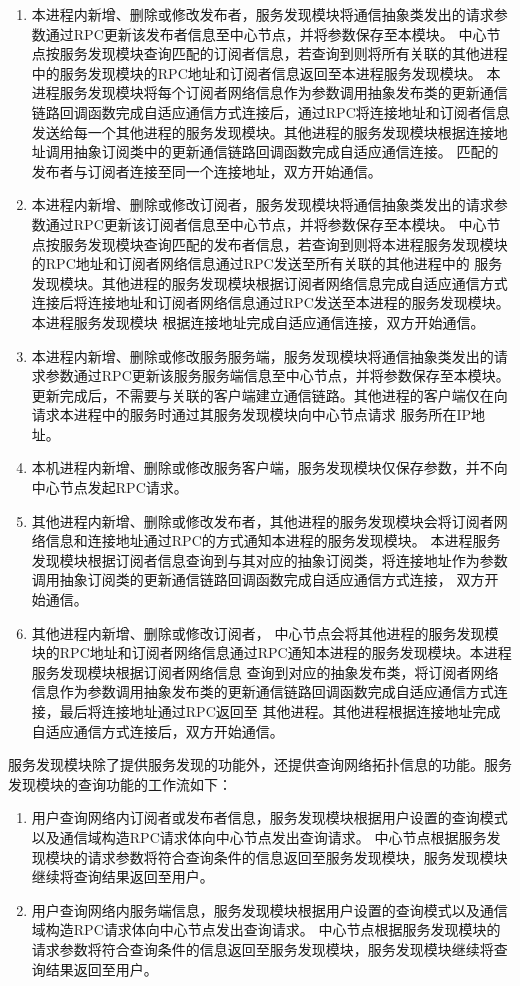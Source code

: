 \begin{enumerate}
  \item 本进程内新增、删除或修改发布者，服务发现模块将通信抽象类发出的请求参数通过RPC更新该发布者信息至中心节点，并将参数保存至本模块。
  中心节点按服务发现模块查询匹配的订阅者信息，若查询到则将所有关联的其他进程中的服务发现模块的RPC地址和订阅者信息返回至本进程服务发现模块。
  本进程服务发现模块将每个订阅者网络信息作为参数调用抽象发布类的更新通信链路回调函数完成自适应通信方式连接后，通过RPC将连接地址和订阅者信息
  发送给每一个其他进程的服务发现模块。其他进程的服务发现模块根据连接地址调用抽象订阅类中的更新通信链路回调函数完成自适应通信连接。
  匹配的发布者与订阅者连接至同一个连接地址，双方开始通信。
  \item 本进程内新增、删除或修改订阅者，服务发现模块将通信抽象类发出的请求参数通过RPC更新该订阅者信息至中心节点，并将参数保存至本模块。
  中心节点按服务发现模块查询匹配的发布者信息，若查询到则将本进程服务发现模块的RPC地址和订阅者网络信息通过RPC发送至所有关联的其他进程中的
  服务发现模块。其他进程的服务发现模块根据订阅者网络信息完成自适应通信方式连接后将连接地址和订阅者网络信息通过RPC发送至本进程的服务发现模块。本进程服务发现模块
  根据连接地址完成自适应通信连接，双方开始通信。
  \item 本进程内新增、删除或修改服务服务端，服务发现模块将通信抽象类发出的请求参数通过RPC更新该服务服务端信息至中心节点，并将参数保存至本模块。
  更新完成后，不需要与关联的客户端建立通信链路。其他进程的客户端仅在向请求本进程中的服务时通过其服务发现模块向中心节点请求
  服务所在IP地址。
  \item 本机进程内新增、删除或修改服务客户端，服务发现模块仅保存参数，并不向中心节点发起RPC请求。
  \item 其他进程内新增、删除或修改发布者，其他进程的服务发现模块会将订阅者网络信息和连接地址通过RPC的方式通知本进程的服务发现模块。
  本进程服务发现模块根据订阅者信息查询到与其对应的抽象订阅类，将连接地址作为参数调用抽象订阅类的更新通信链路回调函数完成自适应通信方式连接，
  双方开始通信。
  \item 其他进程内新增、删除或修改订阅者，
  中心节点会将其他进程的服务发现模块的RPC地址和订阅者网络信息通过RPC通知本进程的服务发现模块。本进程服务发现模块根据订阅者网络信息
  查询到对应的抽象发布类，将订阅者网络信息作为参数调用抽象发布类的更新通信链路回调函数完成自适应通信方式连接，最后将连接地址通过RPC返回至
  其他进程。其他进程根据连接地址完成自适应通信方式连接后，双方开始通信。
\end{enumerate}

服务发现模块除了提供服务发现的功能外，还提供查询网络拓扑信息的功能。服务发现模块的查询功能的工作流如下：
\begin{enumerate}
  \item 用户查询网络内订阅者或发布者信息，服务发现模块根据用户设置的查询模式以及通信域构造RPC请求体向中心节点发出查询请求。
  中心节点根据服务发现模块的请求参数将符合查询条件的信息返回至服务发现模块，服务发现模块继续将查询结果返回至用户。
  \item 用户查询网络内服务端信息，服务发现模块根据用户设置的查询模式以及通信域构造RPC请求体向中心节点发出查询请求。
  中心节点根据服务发现模块的请求参数将符合查询条件的信息返回至服务发现模块，服务发现模块继续将查询结果返回至用户。
\end{enumerate}

